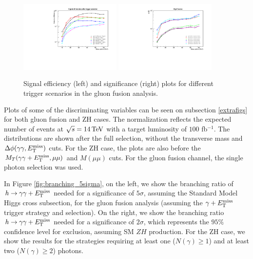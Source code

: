 \begin{figure}[htbp]
\centering
\includegraphics[width=0.45\textwidth]{triggerplots/Efficiencies.pdf}
\includegraphics[width=0.45\textwidth]{triggerplots/Significance.pdf}
\caption{Signal efficiency (left) and significance (right) plots for different trigger scenarios in the gluon fusion analysis.}
\label{fig:triggers}
\end{figure}


Plots of some of the discriminating variables can be seen on subsection \ref{extrafigs} for both gluon fusion and ZH cases. The normalization reflects the expected number of events at $\sqrt{s} = 14 \,\text{Te\hspace{-.08em}V}$ with a target luminosity of $100$ fb$^{-1}$. The distributions are shown after the full selection, without the transverse mass and $\Delta\phi(\gamma\gamma,E_{\mathrm{T}}^{\text{miss}})$ cuts. For the ZH case, the plots are also before the $M_{T}(\gamma\gamma+E_{\mathrm{T}}^{\text{miss}}, \mu\mu)$ and $M(\mu\mu)$ cuts. For the gluon fusion channel, the single photon selection was used.


In Figure \ref{fig:branching_5sigma}, on the left, we show the branching ratio of $h\rightarrow\gamma\gamma+E_{\mathrm{T}}^{\text{miss}}$ needed for a significance of $5\sigma$, assuming the Standard Model Higgs cross subsection, for the gluon fusion analysis (assuming the $\gamma+E_{\mathrm{T}}^{\text{miss}}$ trigger strategy and selection). On the right, we show the branching ratio $h\rightarrow\gamma\gamma+E_{\mathrm{T}}^{\text{miss}}$ needed for a significance of $2\sigma$, which represents the $95\%$ confidence level for exclusion, assuming SM $ZH$ production. For the ZH case, we show the results for the strategies requiring at least one ($N(\gamma) \geq 1$) and at least two ($N(\gamma) \geq 2$) photons. %

